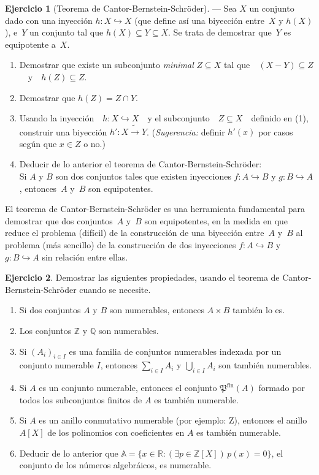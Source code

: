 \documentclass[a4paper,12pt]{book}
\newcommand{\te}{\text}
\def\Pow{\mathfrak{P}}
\def\into{\hookrightarrow}
\def\inonto{\mathbin{\tilde{\to}}}
\def\Pow{\mathfrak{P}}
\def\into{\hookrightarrow}
\def\inonto{\mathbin{\tilde{\to}}}
\theoremstyle{definition}
\newtheorem{ejercicio}{Ejercicio}
\begin{document}
	\begin{ejercicio}[Teorema de Cantor-Bernstein-Schröder]%
		\label{ejer:CantorBernstein}
		--- Sea $X$ un conjunto dado con una inyección $h:X\into X$ (que
		define así una biyección entre~$X$ y $h(X)$), e~$Y$ un conjunto tal
		que $h(X)\subseteq Y\subseteq X$.
		Se trata de demostrar que~$Y$ es equipotente a~$X$.
		\begin{enumerate}\parskip-.5ex
			\item[(1)] Demostrar que existe un subconjunto \emph{minimal}
			$Z\subseteq X$ tal que~~$(X-Y)\subseteq Z$~~y~~$h(Z)\subseteq Z$.
			\item[(2)] Demostrar que $h(Z)=Z\cap Y$.
			\item[(3)] Usando la inyección~~$h:X\into X$~~y el
			subconjunto~~$Z\subseteq X$~~definido en (1), construir una
			biyección $h':X\inonto Y$.\hfill
			(\textit{Sugerencia:} definir $h'(x)$ por casos según que
			$x\in Z$ o no.)
			\item[(4)] Deducir de lo anterior el teorema de
			Cantor-Bernstein-Schröder:\\
			Si $A$ y $B$ son dos conjuntos tales que existen inyecciones
			$f:A\into B$ y $g:B\into A$, entonces~$A$ y~$B$ son equipotentes.
		\end{enumerate}
	\end{ejercicio}
	
	El teorema de Cantor-Bernstein-Schröder es una herramienta
	fundamental para demostrar que dos conjuntos~$A$ y~$B$ son
	equipotentes, en la medida en que reduce el problema (difícil) de la
	construcción de una biyección entre~$A$ y~$B$ al problema (más
	sencillo) de la construcción de dos inyecciones $f:A\into B$ y
	$g:B\into A$ sin relación entre ellas.
	
	
	\begin{ejercicio}
		Demostrar las siguientes propiedades, usando el
		teorema de Cantor-Bernstein-Schröder cuando se necesite.
		\begin{enumerate}\parskip-.5ex
			\item Si dos conjuntos $A$ y $B$ son numerables, entonces $A \times B$ también lo es.
			\item Los conjuntos $\mathbb Z$ y $\mathbb Q$ son numerables.
			\item Si $(A_i)_{i\in I}$ es una familia de conjuntos numerables indexada por un conjunto numerable $I$, entonces $\sum_{i\in I} A_i$ y $\bigcup_{i\in I} A_i$ son también numerables.
			\item  Si $A$ es un conjunto numerable, entonces el conjunto $\Pow^{\te{fin}}(A)$ formado por todos
			los subconjuntos finitos de $A$ es también numerable.
			\item  Si $A$ es un anillo conmutativo numerable (por ejemplo: Z), entonces el anillo $A[X]$ de los
			polinomios con coeficientes en $A$ es también numerable.
			\item Deducir de lo anterior que
			$\mathbb{A} = \{x \in \mathbb R : (\exists p \in \mathbb Z[X])\, p(x) = 0\}$, el conjunto de los números algebráicos,
			es numerable.
		\end{enumerate}
	\end{ejercicio}
	
\end{document}
